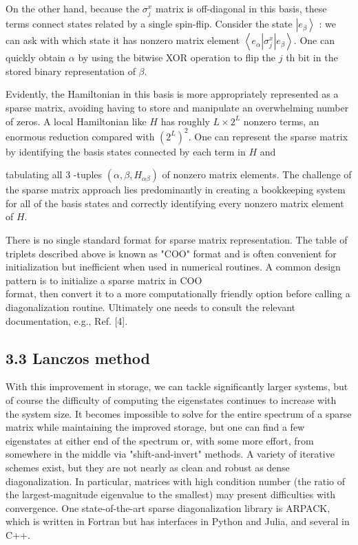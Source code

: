 \documentclass[12pt]{article}
\begin{document}
On the other hand, because the $\sigma_{j}^{x}$ matrix is off-diagonal in this basis, these terms connect states related by a single spin-flip. Consider the state $\left|e_{\beta}\right\rangle$ : we can ask with which state it has nonzero matrix element $\left\langle e_{\alpha}\left|\sigma_{j}^{x}\right| e_{\beta}\right\rangle$. One can quickly obtain $\alpha$ by using the bitwise XOR operation to flip the $j$ th bit in the stored binary representation of $\beta$.

Evidently, the Hamiltonian in this basis is more appropriately represented as a sparse matrix, avoiding having to store and manipulate an overwhelming number of zeros. A local Hamiltonian like $H$ has roughly $L \times 2^{L}$ nonzero terms, an enormous reduction compared with $\left(2^{L}\right)^{2}$. One can represent the sparse matrix by identifying the basis states connected by each term in $H$ and

tabulating all 3 -tuples $\left(\alpha, \beta, H_{\alpha \beta}\right)$ of nonzero matrix elements. The challenge of the sparse matrix approach lies predominantly in creating a bookkeeping system for all of the basis states and correctly identifying every nonzero matrix element of $H$.

There is no single standard format for sparse matrix representation. The table of triplets described above is known as "COO" format and is often convenient for initialization but inefficient when used in numerical routines. A common design pattern is to initialize a sparse matrix in COO\\
format, then convert it to a more computationally friendly option before calling a diagonalization routine. Ultimately one needs to consult the relevant documentation, e.g., Ref. [4].

\subsection*{3.3 Lanczos method}
With this improvement in storage, we can tackle significantly larger systems, but of course the difficulty of computing the eigenstates continues to increase with the system size. It becomes impossible to solve for the entire spectrum of a sparse matrix while maintaining the improved storage, but one can find a few eigenstates at either end of the spectrum or, with some more effort, from somewhere in the middle via "shift-and-invert" methods. A variety of iterative schemes exist, but they are not nearly as clean and robust as dense diagonalization. In particular, matrices with high condition number (the ratio of the largest-magnitude eigenvalue to the smallest) may present difficulties with convergence. One state-of-the-art sparse diagonalization library is ARPACK, which is written in Fortran but has interfaces in Python and Julia, and several in C++.
\end{document}
